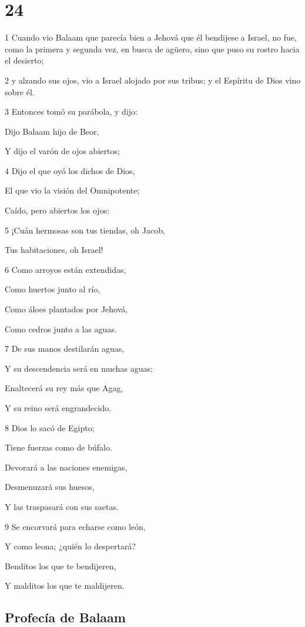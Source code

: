 \chapter{24}

\par 1 Cuando vio Balaam que parecía bien a Jehová que él bendijese a Israel, no fue, como la primera y segunda vez, en busca de agüero, sino que puso su rostro hacia el desierto;
\par 2 y alzando sus ojos, vio a Israel alojado por sus tribus; y el Espíritu de Dios vino sobre él.
\par 3 Entonces tomó su parábola, y dijo:
\par Dijo Balaam hijo de Beor,
\par Y dijo el varón de ojos abiertos;
\par 4 Dijo el que oyó los dichos de Dios,
\par El que vio la visión del Omnipotente;
\par Caído, pero abiertos los ojos:
\par 5 ¡Cuán hermosas son tus tiendas, oh Jacob,
\par Tus habitaciones, oh Israel! 
\par 6 Como arroyos están extendidas,
\par Como huertos junto al río,
\par Como áloes plantados por Jehová,
\par Como cedros junto a las aguas.
\par 7 De sus manos destilarán aguas,
\par Y su descendencia será en muchas aguas;
\par Enaltecerá su rey más que Agag,
\par Y su reino será engrandecido. 
\par 8 Dios lo sacó de Egipto;
\par Tiene fuerzas como de búfalo.
\par Devorará a las naciones enemigas,
\par Desmenuzará sus huesos, 
\par Y las traspasará con sus saetas.
\par 9 Se encorvará para echarse como león,
\par Y como leona; ¿quién lo despertará?
\par Benditos los que te bendijeren,
\par Y malditos los que te maldijeren.

\section*{Profecía de Balaam}

